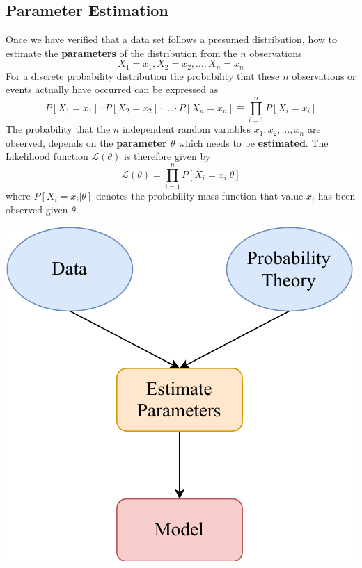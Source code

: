 \documentclass[11pt]{article}
\theoremstyle{definition}
\begin{document}
\subsection{Parameter Estimation}
\begin{minipage}{0.6\linewidth}
	Once we have verified that a data set follows a presumed distribution, how to estimate the \textbf{parameters} of the distribution from the $n$ observations
	\begin{equation*}
		X_1 = x_1, X_2 = x_2, \dots , X_n = x_n
	\end{equation*}
	For a discrete probability distribution the probability that these $n$ observations or events actually have occurred can be expressed as
	\begin{equation*}
		P[X_1 = x_1] \cdot P[X_2 = x_2] \cdot \dots \cdot P[X_n = x_n] \equiv \prod_{i=1}^{n} P[X_i = x_i]
	\end{equation*}
	The probability that the $n$ independent random variables $x_1,x_2,\dots,x_n$ are observed, depends on the \textbf{parameter $\theta$} which needs to be \textbf{estimated}.
	The Likelihood function $\mathcal{L}(\theta)$ is therefore given by
	\begin{equation*}
		\mathcal{L}(\theta) = \prod_{i=1}^{n} P[X_i = x_i | \theta ]
	\end{equation*}
	where $P[X_i = x_i | \theta ]$ denotes the probability mass function that value $x_i$ has been observed given $\theta$.
\end{minipage}
\begin{minipage}{0.4\linewidth}
	\centering
	\includegraphics[keepaspectratio, width=0.8\linewidth]{probtheory_model}
\end{minipage}
\end{document}
